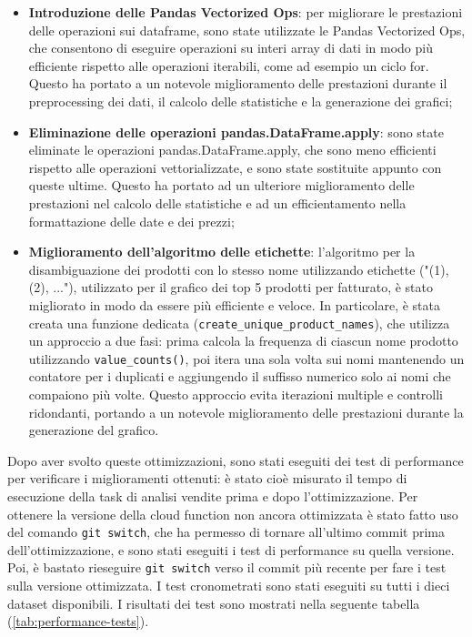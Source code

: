 \begin{itemize}
    \item \textbf{Introduzione delle Pandas Vectorized Ops}: per migliorare le prestazioni delle operazioni sui dataframe, sono state utilizzate le Pandas Vectorized Ops, che consentono di eseguire operazioni su interi array di dati in modo più efficiente rispetto alle operazioni iterabili, come ad esempio un ciclo for. Questo ha portato a un notevole miglioramento delle prestazioni durante il preprocessing dei dati, il calcolo delle statistiche e la generazione dei grafici;
    \item \textbf{Eliminazione delle operazioni pandas.DataFrame.apply}: sono state eliminate le operazioni pandas.DataFrame.apply, che sono meno efficienti rispetto alle operazioni vettorializzate, e sono state sostituite appunto con queste ultime. Questo ha portato ad un ulteriore miglioramento delle prestazioni nel calcolo delle statistiche e ad un efficientamento nella formattazione delle date e dei prezzi;
    \item \textbf{Miglioramento dell'algoritmo delle etichette}: l'algoritmo per la disambiguazione dei prodotti con lo stesso nome utilizzando etichette ("(1), (2), ..."), utilizzato per il grafico dei top 5 prodotti per fatturato, è stato migliorato in modo da essere più efficiente e veloce. In particolare, è stata creata una funzione dedicata (\texttt{create\_unique\_product\_names}), che utilizza un approccio a due fasi: prima calcola la frequenza di ciascun nome prodotto utilizzando \texttt{value\_counts()}, poi itera una sola volta sui nomi mantenendo un contatore per i duplicati e aggiungendo il suffisso numerico solo ai nomi che compaiono più volte. Questo approccio evita iterazioni multiple e controlli ridondanti, portando a un notevole miglioramento delle prestazioni durante la generazione del grafico.
\end{itemize}

Dopo aver svolto queste ottimizzazioni, sono stati eseguiti dei test di performance per verificare i miglioramenti ottenuti: è stato cioè misurato il tempo di esecuzione della task di analisi vendite prima e dopo l'ottimizzazione. Per ottenere la versione della cloud function non ancora ottimizzata è stato fatto uso del comando \texttt{git switch}, che ha permesso di tornare all'ultimo commit prima dell'ottimizzazione, e sono stati eseguiti i test di performance su quella versione. Poi, è bastato rieseguire \texttt{git switch} verso il commit più recente per fare i test sulla versione ottimizzata. I test cronometrati sono stati eseguiti su tutti i dieci dataset disponibili.
I risultati dei test sono mostrati nella seguente tabella (\ref{tab:performance-tests}).

